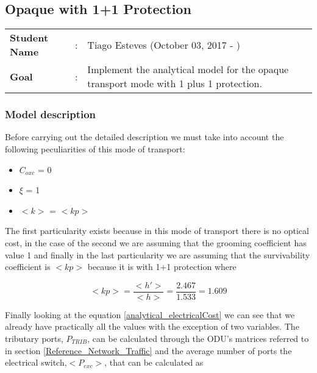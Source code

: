 \clearpage

\subsection{Opaque with 1+1 Protection}\label{analytical_Opaque_Protection}
\begin{tcolorbox}	
\begin{tabular}{p{2.75cm} p{0.2cm} p{10.5cm}} 	
\textbf{Student Name}  &:& Tiago Esteves    (October 03, 2017 - )\\
\textbf{Goal}          &:& Implement the analytical model for the opaque transport mode with 1 plus 1 protection.
\end{tabular}
\end{tcolorbox}

\subsubsection{Model description}

Before carrying out the detailed description we must take into account the following peculiarities of this mode of transport:
\begin{itemize}
  \item $C_{oxc}$ = 0
  \item $\xi$ = 1
  \item $<k>$ = $<kp>$
\end{itemize}

\vspace{11pt}
The first particularity exists because in this mode of transport there is no optical cost, in the case of the second we are assuming that the grooming coefficient has value 1 and finally in the last particularity we are assuming that the survivability coefficient is $<kp>$ because it is with 1+1 protection where

\begin{equation}
<kp> = \frac{<h'>}{<h>} = \frac{2.467}{1.533} = 1.609
\label{coefficient_protec}
\end{equation}

\vspace{11pt}
Finally looking at the equation \ref{analytical_electricalCost}  we can see that we already have practically all the values with the exception of two variables. The tributary ports, $P_{TRIB}$, can be calculated through the ODU's matrices referred to in section \ref{Reference_Network_Traffic} and the average number of ports the electrical switch,$<P_{exc}>$, that can be calculated as

